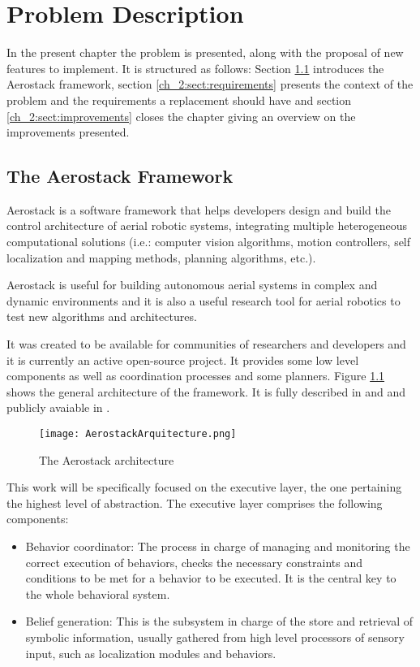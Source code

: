 \chapter{Problem Description}

In the present chapter the problem is presented, along with the proposal of new features to implement. It is structured as follows: Section \ref{ch_2:sect:aerostack} introduces the Aerostack framework, section \ref{ch_2:sect:requirements} presents the context of the problem and the requirements a replacement should have and section \ref{ch_2:sect:improvements} closes the chapter giving an overview on the improvements presented.

  \section{The Aerostack Framework} \label{ch_2:sect:aerostack}

    Aerostack is a software framework that helps developers design and build the control architecture of aerial robotic systems, integrating multiple heterogeneous computational solutions (i.e.: computer vision algorithms, motion controllers, self localization and mapping methods, planning algorithms, etc.).

    Aerostack is useful for building autonomous aerial systems in complex and dynamic environments and it is also a useful research tool for aerial robotics to test new algorithms and architectures.

    It was created to be available for communities of researchers and developers and it is currently an active open-source project. It provides some low level components as well as coordination processes and some planners. Figure \ref{ch_2:fig:aerostack_arqu} shows the general architecture of the framework. It is fully described in \cite{7502591} and \cite{Sanchez-Lopez2017} and publicly avaiable in \cite{aerostack_wiki_web}.

    \pagebreak
    \begin{figure}[ht]
      \centering
      \texttt{[image: AerostackArquitecture.png]}
      \caption{The Aerostack architecture}
      \label{ch_2:fig:aerostack_arqu}
    \end{figure}

    This work will be specifically focused on the executive layer, the one pertaining the highest level of abstraction. The executive layer comprises the following components:

    \begin{itemize}
      \item Behavior coordinator: The process in charge of managing and monitoring the correct execution of behaviors, checks the necessary constraints and conditions to be met for a behavior to be executed. It is the central key to the whole behavioral system.
      \item Belief generation: This is the subsystem in charge of the store and retrieval of symbolic information, usually gathered from high level processors of sensory input, such as localization modules and behaviors.
    \end{itemize}

